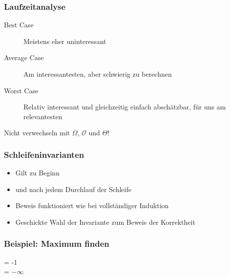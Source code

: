 \begin{frame}
	\frametitle{Laufzeitanalyse}
	\begin{description}
		\item[Best Case] Meistens eher uninteressant
		\item[Average Case] Am interessantesten, aber schwierig zu berechnen
		\item[Worst Case] Relativ interessant und gleichzeitig einfach abschätzbar, für uns am relevantesten
	\end{description}
	\begin{center}
		Nicht verwechseln mit $\Omega$, $\mathcal{O}$ und $\Theta$!
	\end{center}
\end{frame}

\begin{frame}
	\frametitle{Schleifeninvarianten}
	\begin{itemize}
		\item Gilt zu Beginn
		\item und nach jedem Durchlauf der Schleife
		\item Beweis funktioniert wie bei vollständiger Induktion
		\item Geschickte Wahl der Invariante zum Beweis der Korrektheit
	\end{itemize}
\end{frame}

\begin{frame}
	\frametitle{Beispiel: Maximum finden}
	\begin{algorithm}[H]
		\MaxIndex = -1\\
		\Max = $-\infty$\\
	\end{algorithm}
\end{frame}

